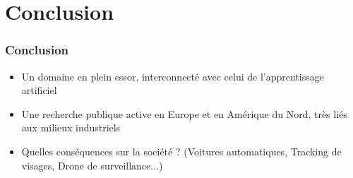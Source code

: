 \documentclass{beamer}
\begin{document}

\section{Conclusion}

\begin{frame}
\frametitle{Conclusion}
	\begin{itemize}
		\item Un domaine en plein essor, interconnecté avec celui de l'apprentissage artificiel
        \item Une recherche publique active en Europe et en Amérique du Nord, très liés aux milieux industriels
        \item Quelles conséquences sur la société ? (Voitures automatiques, Tracking de visages, Drone de surveillance...)
	\end{itemize}

\end{frame}


\end{document}
